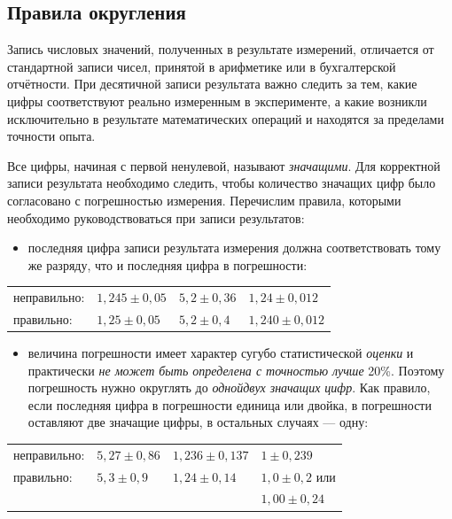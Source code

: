 \documentclass[10pt]{article}
\begin{document}
\subsection{Правила округления\label{subsec:round}}

Запись числовых значений, полученных в результате измерений, отличается
от стандартной записи чисел, принятой в арифметике или в бухгалтерской
отчётности. При десятичной записи результата важно следить за тем,
какие цифры соответствуют реально измеренным в эксперименте, а какие
возникли исключительно в результате математических операций и находятся
за пределами точности опыта.

Все цифры, начиная с первой ненулевой, называют \emph{значащими}.
Для корректной записи результата необходимо следить, чтобы количество
значащих цифр было согласовано с погрешностью измерения. Перечислим
правила, которыми необходимо руководствоваться при записи результатов: 
\begin{itemize}
\item последняя цифра записи результата измерения должна соответствовать
тому же разряду, что и последняя цифра в погрешности:
\end{itemize}
\noindent%
\begin{tabular}{llll}
неправильно:  & $1{,}245\pm0{,}05$  & $5{,}2\pm0{,}36$  & $1{,}24\pm0{,}012$\tabularnewline
правильно:  & $1{,}25\pm0{,}05$  & $5{,}2\pm0{,}4$  & $1{,}240\pm0{,}012$ \tabularnewline
\end{tabular}
\begin{itemize}
\item величина погрешности имеет характер сугубо статистической \emph{оценки}
и практически \emph{не может быть определена с точностью лучше} 20\%.
Поэтому погрешность нужно округлять до \emph{одной\textendash двух
значащих цифр}. Как правило, если последняя цифра в погрешности единица
или двойка, в погрешности оставляют две значащие цифры, в остальных
случаях --- одну:
\end{itemize}
\noindent%
\begin{tabular}{llll}
неправильно:  & $5{,}27\pm0{,}86$  & $1{,}236\pm0{,}137$  & $1\pm0{,}239$\tabularnewline
правильно:  & $5{,}3\pm0{,}9$ & $1{,}24\pm0{,}14$ & $1{,}0\pm0{,}2$ или\tabularnewline
 &  &  & $1{,}00\pm0{,}24$\tabularnewline
\end{tabular}

\medskip{}
\end{document}
